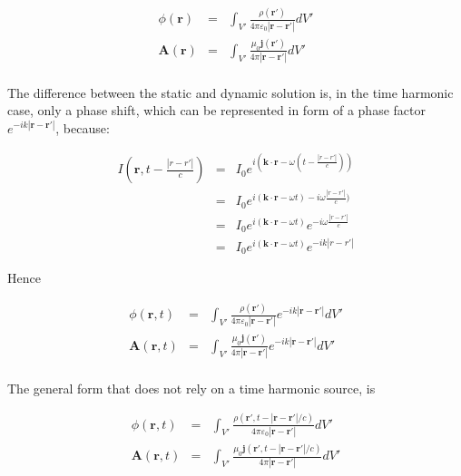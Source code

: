 \documentclass[a4paper,10pt]{thesis}
\begin{document}
\begin{eqnarray}
\phi (\mathbf{r}) &=& \int_{V'} \frac{\rho ( \mathbf{r}' )}{4 \pi \varepsilon_0 |\mathbf{r} - \mathbf{r}'| } dV' \label{staticsolution1}\\
 \mathbf{A}(\mathbf{r}) &=& \int_{V'} \frac{\mu_0 \mathbf{j} ( \mathbf{r}' )}{4 \pi  |\mathbf{r} - \mathbf{r}'| \label{staticsolution2}} dV'
 \end{eqnarray}

\paragraph*{}
The difference between the static and dynamic solution is, in the time harmonic case, only a phase shift, which can be represented in form of a phase factor $e^{-ik|\mathbf{r} - \mathbf{r}'|}$, because:


\begin{eqnarray}
    I \left( \mathbf{r},t-\frac{|r-r'|}{c} \right) &=&I_0e^{i(\mathbf{k}\cdot \mathbf{r}-\omega (t-\frac{|r-r'|}{c}))}\\
 &=&I_0e^{i(\mathbf{k}\cdot \mathbf{r}-\omega t)-i \omega \frac{|r-r'|}{c})}\\
 &=&I_0e^{i(\mathbf{k}\cdot \mathbf{r}-\omega t)}e^{-i \omega \frac{|r-r'|}{c}}\\
&=&I_0e^{i(\mathbf{k}\cdot \mathbf{r}-\omega t)}e^{-i k |r-r'|}
\end{eqnarray}


Hence

\begin{eqnarray}
\phi (\mathbf{r},t) &=& \int_{V'} \frac{\rho ( \mathbf{r}' )}{4 \pi \varepsilon_0 |\mathbf{r} - \mathbf{r}'| } e^{-ik|\mathbf{r} - \mathbf{r}'| } dV' \label{dynamicharmonicsolution1}\\
 \mathbf{A}(\mathbf{r},t) &=& \int_{V'} \frac{\mu_0 \mathbf{j} ( \mathbf{r}' )}{4 \pi  |\mathbf{r} - \mathbf{r}'| \label{dynamicharmonicsolution2}} e^{-ik|\mathbf{r} - \mathbf{r}'| } dV'
 \end{eqnarray}

\paragraph*{}
The general form that does not rely on a time harmonic source, is

\begin{eqnarray}
\phi (\mathbf{r},t) &=& \int_{V'} \frac{\rho ( \mathbf{r}', t-|\mathbf{r} - \mathbf{r}'| /c  )}{4 \pi \varepsilon_0 |\mathbf{r} - \mathbf{r}'| } dV' \label{dynamicsolution1}\\
 \mathbf{A}(\mathbf{r},t) &=& \int_{V'} \frac{\mu_0 \mathbf{j} ( \mathbf{r}', t-|\mathbf{r} - \mathbf{r}'| /c  )}{4 \pi  |\mathbf{r} - \mathbf{r}'| \label{dynamicsolution2}}  dV'
 \end{eqnarray}
\end{document}
